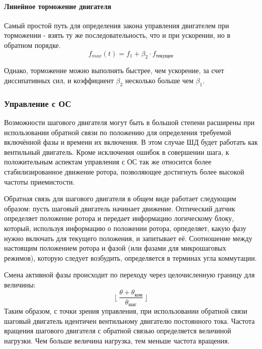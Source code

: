 \paragraph{Линейное торможение двигателя}
Самый простой путь для определения закона управления двигателем при торможении - взять ту же
последовательность, что и при ускорении, но в обратном порядке.
\begin{equation}
    \label{eq_synchronized_control_min_frequency}
    f_{max}(t) = f_{1} + \beta_{2} \cdot f_{\textit{текущее}}
\end{equation}

Однако, торможение можно выполнять быстрее, чем ускорение, за счет диссипативных сил,
и коэффициент $\beta_{2}$ несколько больше чем $\beta_{1}$.

\newpage
\subsubsection{Управление с ОС}
\label{sec_feedback_control}
Возможности шагового двигателя могут быть в большой степени расширены при использовании обратной
связи по положению для определения требуемой включённой фазы и времени их включения. В этом случае ШД
будет работать как вентильный двигатель. Кроме исключения ошибок в совершении шага, к положительным
аспектам управления с ОС так же относится более стабилизированное движение ротора, позволяющее достигнуть
более высокой частоты приемистости.

Обратная связь для шагового двигателя в общем виде работает следующим образом:
пусть шаговый двигатель начинает движение. Оптический датчик определяет положение ротора и передает
информацию логическому блоку, который, используя информацию о положении ротора, орпеделяет, какую фазу
нужно включать для текущего положения, и запитывает её. Соотношение между настоящим положением
ротора и фазой (или фазами для микрошаговых режимов), которую следует возбудить, определяется
в терминах угла коммутации.

Смена активной фазы происходит по переходу через целочисленную границу для величины:
$$
    \lfloor ~\frac{\theta + \theta_\textit{ком}}{\theta_\textit{шаг}}~ \rfloor
$$
Таким образом, с точки зрения управления, при использовании обратной связи шаговый двигатель идентичен
вентильному двигателю постоянного тока.
Частота вращения шагового двигателя с обратной связью определяется величиной нагрузки. Чем больше величина
нагрузка, тем меньше частота вращения.

